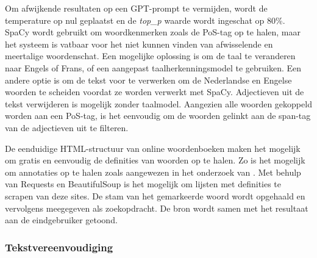 \medspace

Om afwijkende resultaten op een GPT-prompt te vermijden, wordt de temperature op nul geplaatst en de \textit{top\_p} waarde wordt ingeschat op 80\%. SpaCy wordt gebruikt om woordkenmerken zoals de PoS-tag op te halen, maar het systeem is vatbaar voor het niet kunnen vinden van afwisselende en meertalige woordenschat. Een mogelijke oplossing is om de taal te veranderen naar Engels of Frans, of een aangepast taalherkenningsmodel te gebruiken. Een andere optie is om de tekst voor te verwerken om de Nederlandse en Engelse woorden te scheiden voordat ze worden verwerkt met SpaCy. Adjectieven uit de tekst verwijderen is mogelijk zonder taalmodel. Aangezien alle woorden gekoppeld worden aan een PoS-tag, is het eenvoudig om de woorden gelinkt aan de span-tag van de adjectieven uit te filteren.

\medspace

De eenduidige HTML-structuur van online woordenboeken maken het mogelijk om gratis en eenvoudig de definities van woorden op te halen. Zo is het mogelijk om annotaties op te halen zoals aangewezen in het onderzoek van \textcite{Bulte2018}. Met behulp van Requests en BeautifulSoup is het mogelijk om lijsten met definities te scrapen van deze sites. De stam van het gemarkeerde woord wordt opgehaald en vervolgens meegegeven als zoekopdracht. De bron wordt samen met het resultaat aan de eindgebruiker getoond. 

\subsubsection{Tekstvereenvoudiging}

